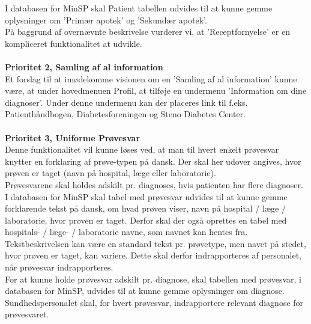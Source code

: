 I databasen for MinSP skal Patient tabellen udvides til at kunne gemme oplysninger om 'Primær apotek' og 'Sekundær apotek'.\\
På baggrund af overnævnte beskrivelse vurderer vi, at 'Receptfornyelse' er en kompliceret funktionalitet at udvikle.
\\\\
\textbf{Prioritet 2, Samling af al information} \\
Et forslag til at imødekomme visionen om en 'Samling af al information' kunne være, at under hovedmenuen Profil, at tilføje en undermenu 'Information om dine diagnoser'. Under denne undermenu kan der placeres link til f.eks. Patienthåndbogen, Diabetesforeningen og Steno Diabetes Center.
\\\\ 
\textbf{Prioritet 3, Uniforme Prøvesvar} \\
Denne funktionalitet vil kunne løses ved, at man til hvert enkelt prøvesvar knytter en forklaring af prøve-typen på dansk. Der skal her udover angives, hvor prøven er taget (navn på hospital, læge eller laboratorie).\\
Prøvesvarene skal holdes adskilt pr. diagnoses, hvis patienten har flere diagnoser.\\
I databasen for MinSP skal tabel med prøvesvar udvides til at kunne gemme forklarende tekst på dansk, om hvad prøven viser, navn på hospital / læge / laboratorie, hvor prøven er taget. Derfor skal der også oprettes en tabel med hospitals- / læge- / laboratorie navne, som navnet kan hentes fra.\\ 
Tekstbeskrivelsen kan være en standard tekst pr. prøvetype, men navet på stedet, hvor prøven er taget, kan variere. Dette skal derfor indrapporteres af personalet, når prøvesvar indrapporteres. \\
For at kunne holde prøvesvar adskilt pr. diagnose, skal tabellen med prøvesvar, i databasen for MinSP, udvides til at kunne gemme oplysninger om diagnose. Sundhedspersonalet skal, for hvert prøvesvar, indrapportere relevant diagnose for prøvesvaret. 
